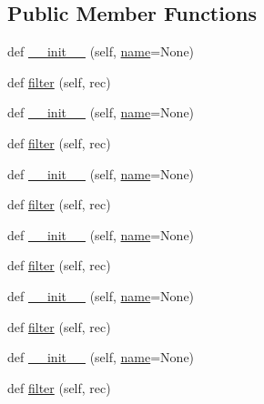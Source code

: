 \subsection*{Public Member Functions}
\begin{DoxyCompactItemize}
\item 
def \hyperlink{classwaflib_1_1_logs_1_1log__filter_a6c54cc307bed856f8358a81128e99f27}{\+\_\+\+\_\+init\+\_\+\+\_\+} (self, \hyperlink{lib_2expat_8h_a1b49b495b59f9e73205b69ad1a2965b0}{name}=None)
\item 
def \hyperlink{classwaflib_1_1_logs_1_1log__filter_a4a0dd2406d20699ef95b5e3b59660af2}{filter} (self, rec)
\item 
def \hyperlink{classwaflib_1_1_logs_1_1log__filter_a6c54cc307bed856f8358a81128e99f27}{\+\_\+\+\_\+init\+\_\+\+\_\+} (self, \hyperlink{lib_2expat_8h_a1b49b495b59f9e73205b69ad1a2965b0}{name}=None)
\item 
def \hyperlink{classwaflib_1_1_logs_1_1log__filter_a4a0dd2406d20699ef95b5e3b59660af2}{filter} (self, rec)
\item 
def \hyperlink{classwaflib_1_1_logs_1_1log__filter_a6c54cc307bed856f8358a81128e99f27}{\+\_\+\+\_\+init\+\_\+\+\_\+} (self, \hyperlink{lib_2expat_8h_a1b49b495b59f9e73205b69ad1a2965b0}{name}=None)
\item 
def \hyperlink{classwaflib_1_1_logs_1_1log__filter_a4a0dd2406d20699ef95b5e3b59660af2}{filter} (self, rec)
\item 
def \hyperlink{classwaflib_1_1_logs_1_1log__filter_a6c54cc307bed856f8358a81128e99f27}{\+\_\+\+\_\+init\+\_\+\+\_\+} (self, \hyperlink{lib_2expat_8h_a1b49b495b59f9e73205b69ad1a2965b0}{name}=None)
\item 
def \hyperlink{classwaflib_1_1_logs_1_1log__filter_a4a0dd2406d20699ef95b5e3b59660af2}{filter} (self, rec)
\item 
def \hyperlink{classwaflib_1_1_logs_1_1log__filter_a6c54cc307bed856f8358a81128e99f27}{\+\_\+\+\_\+init\+\_\+\+\_\+} (self, \hyperlink{lib_2expat_8h_a1b49b495b59f9e73205b69ad1a2965b0}{name}=None)
\item 
def \hyperlink{classwaflib_1_1_logs_1_1log__filter_a4a0dd2406d20699ef95b5e3b59660af2}{filter} (self, rec)
\item 
def \hyperlink{classwaflib_1_1_logs_1_1log__filter_a6c54cc307bed856f8358a81128e99f27}{\+\_\+\+\_\+init\+\_\+\+\_\+} (self, \hyperlink{lib_2expat_8h_a1b49b495b59f9e73205b69ad1a2965b0}{name}=None)
\item 
def \hyperlink{classwaflib_1_1_logs_1_1log__filter_a4a0dd2406d20699ef95b5e3b59660af2}{filter} (self, rec)

\end{DoxyCompactItemize}
